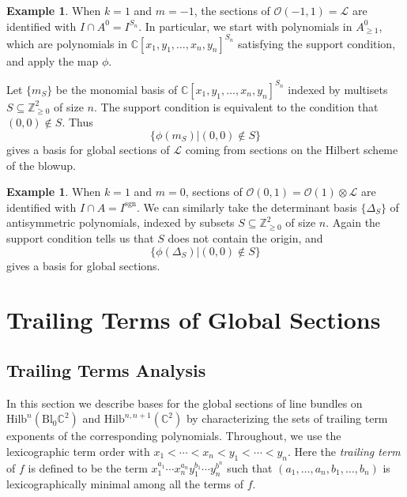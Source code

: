 \documentclass[12pt]{amsart}
\newcommand{\Hilb}{\mathrm{Hilb}}
\newcommand{\C}{\mathbb{C}}
\newcommand{\Z}{\mathbb{Z}}
\newcommand{\CL}{\mathcal{L}}
\newcommand{\CO}{\mathcal{O}}
\newcommand{\sgn}{\mathrm{sgn}}
\newcommand{\Bl}{\mathrm{Bl}}
\numberwithin{equation}{section}
\theoremstyle{definition}
\newtheorem{example}[theorem]{Example}
\begin{document}

\begin{example}
    When $k=1$ and $m=-1$, the sections of $\CO(-1,1) = \CL$ are identified with $I \cap A^0 = I^{S_n}$. In particular, we start with polynomials in $A^0_{\geq 1}$, which are polynomials in $\C[x_1, y_1, \dots, x_n, y_n]^{S_n}$ satisfying the support condition, and apply the map $\phi$.

    Let $\{m_S\}$ be the monomial basis of $\C[x_1, y_1, \dots, x_n, y_n]^{S_n}$ indexed by multisets $S \subseteq \Z^2_{\geq 0}$ of size $n$. The support condition is equivalent to the condition that $(0,0) \notin S$. Thus 
    $$\{\phi(m_S) | (0,0) \notin S\}$$
    gives a basis for global sections of $\CL$ coming from sections on the Hilbert scheme of the blowup.
\end{example}

\begin{example}
    When $k=1$ and $m=0$, sections of $\CO(0,1) = \CO(1) \otimes \CL$ are identified with $I \cap A = I^{\sgn}$. We can similarly take the determinant basis $\{\Delta_S\}$ of antisymmetric polynomials, indexed by subsets $S \subseteq \Z^2_{\geq 0}$ of size $n$. Again the support condition tells us that $S$ does not contain the origin, and 
    $$\{\phi(\Delta_S) | (0,0) \notin S \}$$ 
    gives a basis for global sections.
\end{example}

\section{Trailing Terms of Global Sections}

\subsection{Trailing Terms Analysis}

In this section we describe bases for the global sections of line bundles on $\Hilb^n(\Bl_0 \C^2)$ and $\Hilb^{n,n+1}(\C^2)$ by characterizing the sets of trailing term exponents of the corresponding polynomials. Throughout, we use the lexicographic term order with $x_1<\cdots<x_n<y_1<\cdots<y_n$. Here the \textit{trailing term} of $f$ is defined to be the term $x_1^{a_1}\cdots x_n^{a_n}y_1^{b_1}\cdots y_n^{b^n}$ such that $(a_1,\dots,a_n,b_1,\dots,b_n)$ is lexicographically minimal among all the terms of $f$. 
\end{document}
